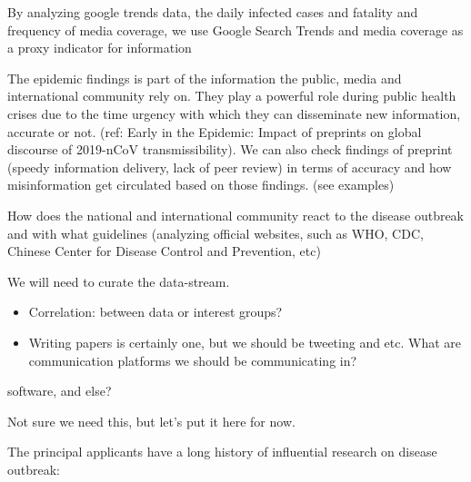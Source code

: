 By analyzing google trends data, the daily infected cases and fatality and frequency of media coverage, we use Google Search Trends and media coverage as a proxy indicator for information

The epidemic findings is part of the information the public, media and international community rely on. They play a powerful role during public health crises due to the time urgency with which they can disseminate new information, accurate or not. (ref: Early in the Epidemic: Impact of preprints on global discourse of 2019-nCoV transmissibility). We can also check findings of preprint (speedy information delivery, lack of peer review) in terms of accuracy and how misinformation get circulated based on those findings. (see examples)

How does the national and international community react to the disease outbreak and with what guidelines (analyzing official websites, such as WHO, CDC, Chinese Center for Disease Control and Prevention, etc)

We will need to curate the data-stream.

\begin{itemize}
\item{Correlation: between data or interest groups?}
\end{itemize}

\begin{itemize}
\item{Writing papers is certainly one, but we should be tweeting and etc. What are communication platforms we should be communicating in?}
\end{itemize}


software, and else?

Not sure we need this, but let's put it here for now. 


The principal applicants have a long history of influential research on disease outbreak: 

